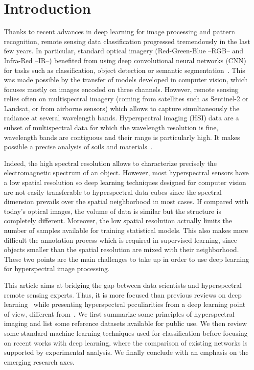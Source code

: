 \documentclass[journal]{IEEEtran}
\begin{document}
\IEEEpeerreviewmaketitle



\section{Introduction}

Thanks to recent advances in deep learning for image processing and pattern recognition, remote sensing data classification progressed tremendously in the last few years. In particular, standard optical imagery (Red-Green-Blue --RGB-- and Infra-Red --IR--) benefited from using deep convolutional neural networks (CNN) for tasks such as classification, object detection or semantic segmentation~\cite{audebert_semantic_2016,volpi_dense_2017,marmanis_semantic_2016}. This was made possible by the transfer of models developed in computer vision, which focuses mostly on images encoded on three channels. However, remote sensing relies often on multispectral imagery (coming from satellites such as Sentinel-2 or Landsat, or from airborne sensors) which allows to capture simultaneously the radiance at several wavelength bands. Hyperspectral imaging (HSI) data are a subset of multispectral data for which the wavelength resolution is fine, wavelength bands are contiguous and their range is particularly high. It makes possible a precise analysis of soils and materials~\cite{bioucas-dias-hyper-GRSM13, cubero-castan_physics-based_2015}.




Indeed, the high spectral resolution allows to characterize precisely the electromagnetic spectrum of an object. However, most hyperspectral sensors have a low spatial resolution so deep learning techniques designed for computer vision are not easily transferable to hyperspectral data cubes since the spectral dimension prevails over the spatial neighborhood in most cases. If compared with today's optical images, the volume of data is similar but the structure is completely different. Moreover, the low spatial resolution actually limits the number of samples available for training statistical models. This also makes more difficult the annotation process which is required in supervised learning, since objects smaller than the spatial resolution are mixed with their neighborhood. These two points are the main challenges to take up in order to use deep learning for hyperspectral image processing.





This article aims at bridging the gap between data scientists and hyperspectral remote sensing experts. Thus, it is more focused than previous reviews on deep learning~\cite{zhu-deep-in-RS-GRSM2017} while presenting hyperspectral peculiarities from a deep learning point of view, different from~\cite{ghamisi-advances-HSI-overview-GRSM2017}. We first summarize some principles of hyperspectral imaging and list some reference datasets available for public use. We then review some standard machine learning techniques used for classification before focusing on recent works with deep learning, where the comparison of existing networks is supported by experimental analysis. We finally conclude with an emphasis on the emerging research axes.
\end{document}
